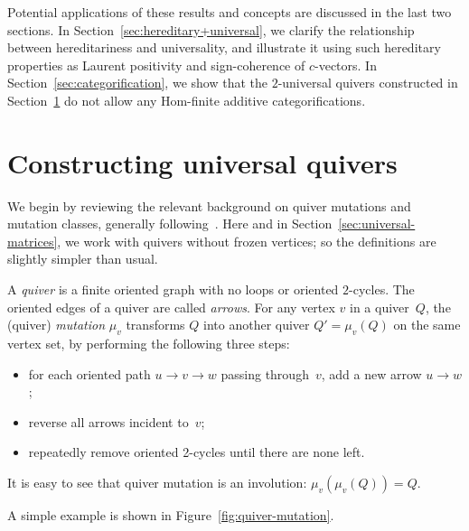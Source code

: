 \documentclass[ALCO,ThmDefs,Unicode,epreuves,published]{cedram}
\begin{document}
Potential applications of these results and concepts are discussed 
in the last two sections. 
In Section~\ref{sec:hereditary+universal}, we clarify the relationship between hereditariness and universality, 
and illustrate it using such hereditary properties as 
Laurent positivity and sign-coherence of $c$-vectors. 
In Section~\ref{sec:categorification}, 
we show that the $2$-universal quivers constructed in 
Section~\ref{sec:constructing-universal-quivers}
do not allow any Hom-finite additive categorifications. 


\section{Constructing universal quivers}
\label{sec:constructing-universal-quivers}

We begin by reviewing the relevant background on quiver mutations and mutation classes, generally following~\cite[Sections~2.1, 2.6, 4.1]{FWZ}. 
Here and in Section~\ref{sec:universal-matrices}, 
we work with quivers without frozen vertices; so the definitions are slightly simpler than usual. 

\begin{definition}
\label{def:quiver-mutation}
A \emph{quiver} is a finite oriented graph with no loops or oriented $2$-cycles. The oriented edges of a quiver are called \emph{arrows}. For any vertex $v$ in a quiver~$Q$, the (quiver) \emph{mutation} $\mu_v$ transforms $Q$ into another quiver $Q'=\mu_v(Q)$ on the same vertex set, by performing the following three steps:
\begin{itemize} %
\item
for each oriented path $u\to v\to w$ passing through~$v$, add a new arrow
$u\to w$; 
\item
reverse all arrows incident to~$v$; 
\item
repeatedly remove oriented 2-cycles until there are none left.
\end{itemize}
\end{definition}

It is easy to see that quiver mutation is an involution: $\mu_v(\mu_v(Q))=Q$. 

A simple example is shown in Figure~\ref{fig:quiver-mutation}. 
\end{document}
